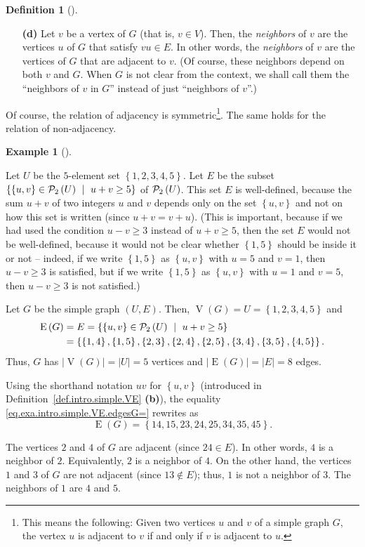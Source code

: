 \documentclass[numbers=enddot,12pt,final,onecolumn,notitlepage]{scrartcl}%
\theoremstyle{definition}
\newtheorem{defi}[theo]{Definition}
\newenvironment{definition}[1][]
{\begin{defi}[#1]\begin{leftbar}}
{\end{leftbar}\end{defi}}
\newtheorem{exam}[theo]{Example}
\newenvironment{example}[1][]
{\begin{exam}[#1]\begin{leftbar}}
{\end{leftbar}\end{exam}}
\newcommand{\powset}[2][]{\ifthenelse{\equal{#2}{}}{\mathcal{P}\left(#1\right)}{\mathcal{P}_{#1}\left(#2\right)}}
\newcommand{\set}[1]{\left\{ #1 \right\}}
\newcommand{\abs}[1]{\left| #1 \right|}
\newcommand{\tup}[1]{\left( #1 \right)}
\newcommand{\verts}[1]{\operatorname{V}\left( #1 \right)}
\newcommand{\edges}[1]{\operatorname{E}\left( #1 \right)}
\begin{document}
\begin{definition}
\begin{enumerate}
\item[\textbf{(d)}] Let $v$ be a vertex of $G$ (that is, $v \in V$).
Then, the \textit{neighbors} of $v$ are the vertices $u$ of $G$ that
satisfy $vu \in E$.
In other words, the \textit{neighbors} of $v$ are the vertices of
$G$ that are adjacent to $v$.
(Of course, these neighbors depend on both $v$ and
$G$. When $G$ is not clear from the context, we shall call them the
``neighbors of $v$ in $G$'' instead of just ``neighbors of $v$''.)

\end{enumerate}

\end{definition}

Of course, the relation of adjacency is symmetric\footnote{This means
the following: Given two vertices $u$ and $v$ of a simple graph $G$,
the vertex $u$ is adjacent to $v$ if and only if $v$ is adjacent to
$u$.}. The same holds for the relation of non-adjacency.

\begin{example} \label{exa.intro.simple.VE}
Let $U$ be the $5$-element set $\set{1,2,3,4,5}$. Let $E$ be the
subset $\set{\set{u,v} \in \powset[2]{U} \ \mid \ u + v \geq 5 }$
of $\powset[2]{U}$. This set $E$ is well-defined, because the sum
$u + v$ of two integers $u$ and $v$ depends only on the set
$\set{u,v}$ and not on how this set is written (since
$u + v = v + u$). (This is important, because if we had used the
condition $u - v \geq 3$ instead of $u + v \geq 5$, then the set $E$
would not be well-defined, because it would not be clear whether
$\set{1, 5}$ should be inside it or not -- indeed, if we write
$\set{1, 5}$ as $\set{u, v}$ with $u = 5$ and $v = 1$, then
$u - v \geq 3$ is satisfied, but if we write $\set{1, 5}$ as
$\set{u, v}$ with $u = 1$ and $v = 5$, then $u - v \geq 3$ is not
satisfied.)

Let $G$ be the simple graph $\tup{U, E}$. Then, $\verts{G} = U
= \set{1,2,3,4,5}$ and
\begin{align}
\edges{G} &= E
= \set{\set{u,v} \in \powset[2]{U} \ \mid \ u + v \geq 5 }
\nonumber \\
&= \set{\set{1,4}, \set{1,5},
        \set{2,3}, \set{2,4}, \set{2,5},
        \set{3,4}, \set{3,5},
        \set{4,5}} .
\label{eq.exa.intro.simple.VE.edgesG=}
\end{align}
Thus, $G$ has $\abs{\verts{G}} = \abs{U} = 5$ vertices and
$\abs{\edges{G}} = \abs{E} = 8$ edges.

Using the shorthand notation
$uv$ for $\set{u, v}$ (introduced in
Definition~\ref{def.intro.simple.VE} \textbf{(b)}), the equality
\eqref{eq.exa.intro.simple.VE.edgesG=} rewrites as
\[
\edges{G}
= \set{14, 15, 23, 24, 25, 34, 35, 45} .
\]

The vertices $2$ and $4$ of $G$ are adjacent (since $24 \in E$).
In other words, $4$ is a neighbor of $2$. Equivalently, $2$ is a
neighbor of $4$. On the other hand, the vertices $1$ and $3$ of $G$
are not adjacent (since $13 \notin E$); thus, $1$ is not a neighbor
of $3$. The neighbors of $1$ are $4$ and $5$.
\end{example}
\end{document}
